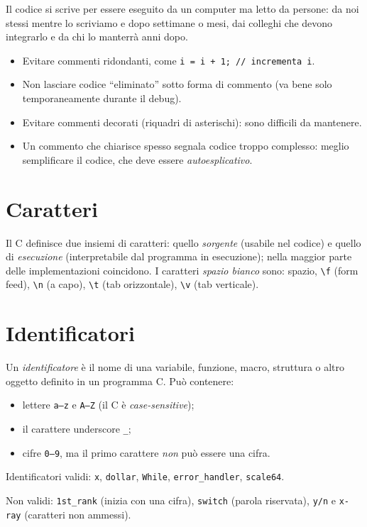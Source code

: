 \documentclass[11pt,a4paper]{article}
\begin{document}
Il codice si scrive per essere eseguito da un computer ma letto da persone:
da noi stessi mentre lo scriviamo e dopo settimane o mesi, dai colleghi che
devono integrarlo e da chi lo manterrà anni dopo.
\begin{itemize}
    \item Evitare commenti ridondanti, come \lstinline|i = i + 1; // incrementa i|.
    \item Non lasciare codice ``eliminato'' sotto forma di commento (va bene
          solo temporaneamente durante il debug).
    \item Evitare commenti decorati (riquadri di asterischi): sono difficili da
          mantenere.
    \item Un commento che chiarisce spesso segnala codice troppo complesso:
          meglio semplificare il codice, che deve essere \emph{autoesplicativo}.
\end{itemize}

\section{Caratteri}

Il C definisce due insiemi di caratteri: quello \emph{sorgente} (usabile nel
codice) e quello di \emph{esecuzione} (interpretabile dal programma in
esecuzione); nella maggior parte delle implementazioni coincidono. I caratteri
\emph{spazio bianco} sono: spazio, \verb|\f| (form feed), \verb|\n| (a capo),
\verb|\t| (tab orizzontale), \verb|\v| (tab verticale).

\section{Identificatori}

\begin{definizione}
Un \emph{identificatore} è il nome di una variabile, funzione, macro,
struttura o altro oggetto definito in un programma C. Può contenere:
\begin{itemize}
    \item lettere \texttt{a--z} e \texttt{A--Z} (il C è \emph{case-sensitive});
    \item il carattere underscore \texttt{\_};
    \item cifre \texttt{0--9}, ma il primo carattere \emph{non} può essere una cifra.
\end{itemize}
\end{definizione}

\begin{esempio}
Identificatori validi: \texttt{x}, \texttt{dollar}, \texttt{While},
\texttt{error\_handler}, \texttt{scale64}.

Non validi: \texttt{1st\_rank} (inizia con una cifra), \texttt{switch} (parola
riservata), \texttt{y/n} e \texttt{x-ray} (caratteri non ammessi).
\end{esempio}
\end{document}
